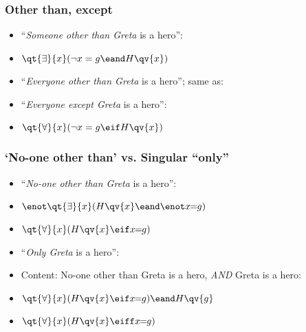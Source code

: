 \begin{frame}
  \frametitle{Other than, except}
  
  
  \begin{itemize}[<+->]
    \item ``\emph{Someone other than Greta} is a hero'':
    \item[] \emph{$\qt{\exists}{x}(\lnot x = g \eand H\qv{x})$}
    \item ``\emph{Everyone other than Greta} is a hero''; same as:
    \item ``\emph{Everyone except Greta} is a hero'':
    \item[] \emph{$\qt{\forall}{x}(\lnot x = g \eif H\qv{x})$}
    \end{itemize}
\end{frame}


\begin{frame}
  \frametitle{`No-one other than' vs. Singular ``only''}

  \begin{itemize}[<+->]
    \item ``\emph{No-one other than Greta} is a hero'':
    \item[] \emph{$\enot\qt{\exists}{x}(H\qv{x} \eand \enot x\!\!=\!\!g)$}
    \item[] \emph{$\qt{\forall}{x}(H\qv{x} \eif x\!\!=\!\!g)$}
    \item ``\emph{Only Greta} is a hero'':
    \item Content: No-one other than Greta is a hero, \emph{AND} Greta is a hero:
    \item[] \emph{$\qt{\forall}{x}(H\qv{x} \eif x\!\!=\!\!g) \eand H\qv{g}$}
    \item[] \emph{$\qt{\forall}{x}(H\qv{x} \eiff x\!\!=\!\!g)$}
  \end{itemize}
  \end{frame}
  
